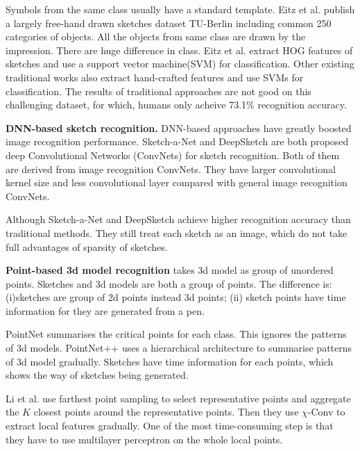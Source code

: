 Symbols from the same class usually have a standard template. Eitz et al. \cite{Eitz2012HowDH} publish a largely free-hand drawn sketches dataset TU-Berlin including common 250 categories of objects. All the objects from same class are drawn by the impression. There are huge difference in class. Eitz et al. extract HOG features of sketches and use a support vector machine(SVM) for classification. Other existing traditional works \cite{LiHSG15, Schneider2014SketchCA} also extract hand-crafted features and use SVMs for classification. The results of traditional approaches are not good on this challenging dataset, for which, humans only acheive 73.1\% recognition accuracy.

\textbf{DNN-based sketch recognition.} DNN-based approaches have greatly boosted image recognition performance. Sketch-a-Net \cite{Yu2015SketchaNetTB} and DeepSketch \cite{Seddati2015DeepSketchDC} are both proposed deep Convolutional Networks (ConvNets) for sketch recognition. Both of them are derived from image recognition ConvNets. They have larger convolutional kernel size and less convolutional layer compared with general image recognition ConvNets.

Although Sketch-a-Net \cite{Yu2015SketchaNetTB} and DeepSketch \cite{Seddati2015DeepSketchDC} achieve higher recognition accuracy than traditional methods. They still treat each sketch as an image, which do not take full advantages of sparsity of sketches.

\textbf{Point-based 3d model recognition} takes 3d model as group of unordered points. Sketches and 3d models are both a group of points. The difference is: (i)sketches are group of 2d points instead 3d points; (ii) sketch points have time information for they are generated from a pen.

PointNet \cite{qi2017pointnet} summarises the critical points for each class. This ignores the patterns of 3d models. PointNet++ \cite{qi2017pointnetplusplus} uses a hierarchical architecture to summarise patterns of 3d model gradually. Sketches have time information for each points, which shows the way of sketches being generated.

Li et al. \cite{1801.07791} use farthest point sampling to select representative points and  aggregate the $K$ closest points around the representative points. Then they use $\chi$-Conv to extract local features gradually. One of the most time-consuming step is that they have to use multilayer perceptron on the whole local points.

